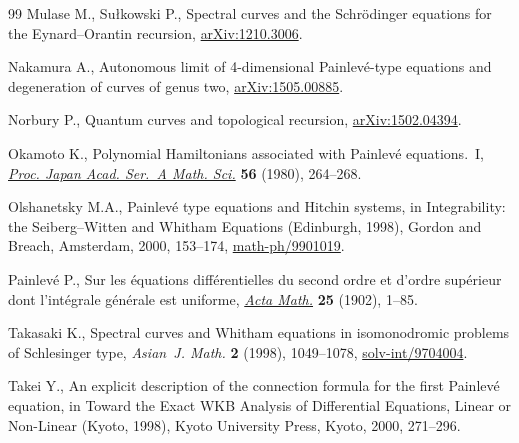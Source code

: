 \documentclass[pdftex]{sigma}
\theoremstyle{definition}
\numberwithin{equation}{section}
\begin{document}
\begin{thebibliography}{99}
Mulase M., Su{\l}kowski P., Spectral curves and the Schr\"odinger equations for
  the {E}ynard--{O}rantin recursion, \href{http://arxiv.org/abs/1210.3006}{arXiv:1210.3006}.

Nakamura A., Autonomous limit of 4-dimensional Painlev\'e-type equations and
  degeneration of curves of genus two, \href{http://arxiv.org/abs/1505.00885}{arXiv:1505.00885}.

Norbury P., Quantum curves and topological recursion, \href{http://arxiv.org/abs/1502.04394}{arXiv:1502.04394}.

Okamoto K., Polynomial {H}amiltonians associated with {P}ainlev\'e
  equations.~{I}, \href{http://dx.doi.org/10.3792/pjaa.56.264}{\textit{Proc. Japan Acad. Ser.~A Math. Sci.}} \textbf{56}
  (1980), 264--268.

Olshanetsky M.A., Painlev\'e type equations and {H}itchin systems, in
  Integrability: the {S}eiberg--{W}itten and {W}hitham Equations ({E}dinburgh,
  1998), Gordon and Breach, Amsterdam, 2000, 153--174,
  \href{http://arxiv.org/abs/math-ph/9901019}{math-ph/9901019}.

Painlev{\'e} P., Sur les \'equations dif\/f\'erentielles du second ordre et
  d'ordre sup\'erieur dont l'int\'egrale g\'en\'erale est uniforme,
  \href{http://dx.doi.org/10.1007/BF02419020}{\textit{Acta Math.}} \textbf{25} (1902), 1--85.

Takasaki K., Spectral curves and {W}hitham equations in isomonodromic problems
  of {S}chlesinger type, \textit{Asian~J. Math.} \textbf{2} (1998), 1049--1078,
  \href{http://arxiv.org/abs/solv-int/9704004}{solv-int/9704004}.

Takei Y., An explicit description of the connection formula for the f\/irst
  {P}ainlev\'e equation, in Toward the Exact {WKB} Analysis of Dif\/ferential
  Equations, Linear or Non-Linear ({K}yoto, 1998), Kyoto University Press,
  Kyoto, 2000, 271--296.

\end{thebibliography}\LastPageEnding
\end{document}

